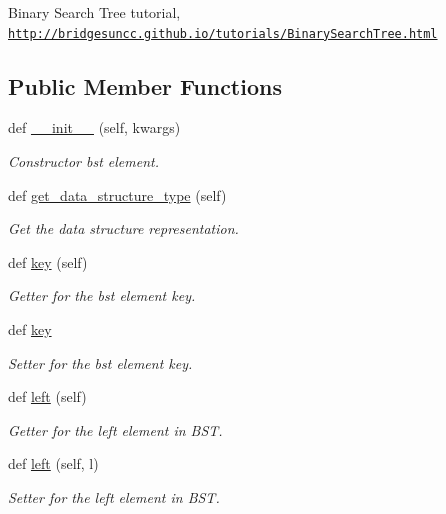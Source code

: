 Binary Search Tree tutorial, \href{http://bridgesuncc.github.io/tutorials/BinarySearchTree.html}{\tt http\+://bridgesuncc.\+github.\+io/tutorials/\+Binary\+Search\+Tree.\+html} \subsection*{Public Member Functions}
\begin{DoxyCompactItemize}
\item 
def \hyperlink{classbridges_1_1bst__element_1_1_b_s_t_element_ab5f7e1266a3e1777472702f5a3f595c5}{\+\_\+\+\_\+init\+\_\+\+\_\+} (self, kwargs)
\begin{DoxyCompactList}\small\item\em Constructor bst element. \end{DoxyCompactList}\item 
def \hyperlink{classbridges_1_1bst__element_1_1_b_s_t_element_ad6763a7381b91e16d9dc927a6f501c81}{get\+\_\+data\+\_\+structure\+\_\+type} (self)
\begin{DoxyCompactList}\small\item\em Get the data structure representation. \end{DoxyCompactList}\item 
def \hyperlink{classbridges_1_1bst__element_1_1_b_s_t_element_ab8fc663b1168808f83ab157e66c793d9}{key} (self)
\begin{DoxyCompactList}\small\item\em Getter for the bst element key. \end{DoxyCompactList}\item 
def \hyperlink{classbridges_1_1bst__element_1_1_b_s_t_element_a46236bc9db305c61429a56f7ed74df64}{key}
\begin{DoxyCompactList}\small\item\em Setter for the bst element key. \end{DoxyCompactList}\item 
def \hyperlink{classbridges_1_1bst__element_1_1_b_s_t_element_adb40ae0f98fe1cb7f153494c544d3f9f}{left} (self)
\begin{DoxyCompactList}\small\item\em Getter for the left element in B\+ST. \end{DoxyCompactList}\item 
def \hyperlink{classbridges_1_1bst__element_1_1_b_s_t_element_a0b45e63b73faabb6b969dd6222e07942}{left} (self, l)
\begin{DoxyCompactList}\small\item\em Setter for the left element in B\+ST. \end{DoxyCompactList}\item 

\end{DoxyCompactItemize}
